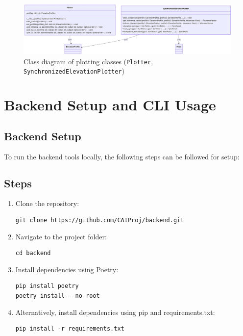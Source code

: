 \documentclass[12pt]{article}
\begin{document}
\begin{figure}[h!]
    \centering
    \includegraphics[width=\textwidth]{Project_Screenshots/class_diagram_plotter.png}
    \caption{Class diagram of plotting classes (\texttt{Plotter}, \texttt{SynchronizedElevationPlotter})}
\end{figure}

\clearpage
\section{Backend Setup and CLI Usage}

\subsection*{Backend Setup}

To run the backend tools locally, the following steps can be followed for setup:

\subsection*{Steps}
\begin{enumerate}
    \item Clone the repository:
    \begin{lstlisting}
git clone https://github.com/CAIProj/backend.git
    \end{lstlisting}

    \item Navigate to the project folder:
    \begin{lstlisting}
cd backend
    \end{lstlisting}

    \item Install dependencies using Poetry:
    \begin{lstlisting}
pip install poetry
poetry install --no-root
    \end{lstlisting}

    \item Alternatively, install dependencies using pip and requirements.txt:
    \begin{lstlisting}
pip install -r requirements.txt
    \end{lstlisting}
\end{enumerate}
\end{document}
